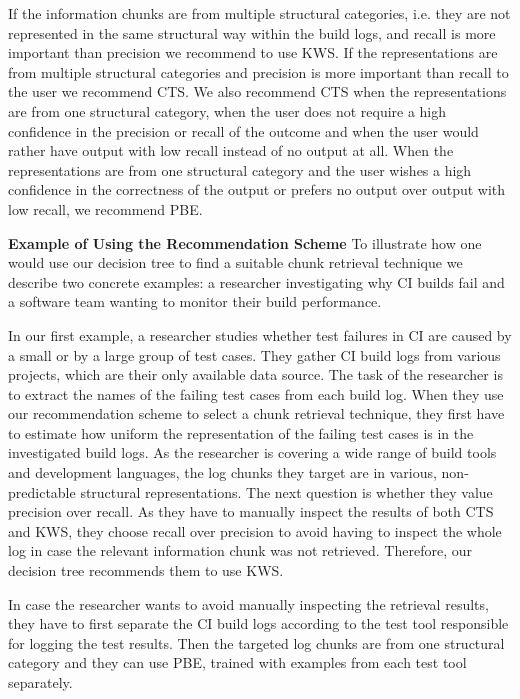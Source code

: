 If the information chunks are from multiple structural categories, i.e. they are not represented in the same structural way within the build logs, and recall is more important than precision we recommend to use KWS\@.
If the representations are from multiple structural categories and precision is more important than recall to the user we recommend CTS\@.
We also recommend CTS when the representations are from one structural category, when the user does not require a high confidence in the precision or recall of the outcome and when the user would rather have output with low recall instead of no output at all.
When the representations are from one structural category and the user wishes a high confidence in the correctness of the output or prefers no output over output with low recall, we recommend PBE\@.

\noindent
\textbf{Example of Using the Recommendation Scheme}
To illustrate how one would use our decision tree to find a suitable chunk retrieval technique we describe two concrete examples: a researcher investigating why CI builds fail and a software team wanting to monitor their build performance.

In our first example, a researcher studies whether test failures in CI are caused by a small or by a large group of test cases.
They gather CI build logs from various projects, which are their only available data source.
The task of the researcher is to extract the names of the failing test cases from each build log.
When they use our recommendation scheme to select a chunk retrieval technique, they first have to estimate how uniform the representation of the failing test cases is in the investigated build logs.
As the researcher is covering a wide range of build tools and development languages, the log chunks they target are in various, non-predictable structural representations.
The next question is whether they value precision over recall.
As they have to manually inspect the results of both CTS and KWS, they choose recall over precision to avoid having to inspect the whole log in case the relevant information chunk was not retrieved.
Therefore, our decision tree recommends them to use KWS\@.

In case the researcher wants to avoid manually inspecting the retrieval results, they have to first separate the CI build logs according to the test tool responsible for logging the test results.
Then the targeted log chunks are from one structural category and they can use PBE, trained with examples from each test tool separately.

